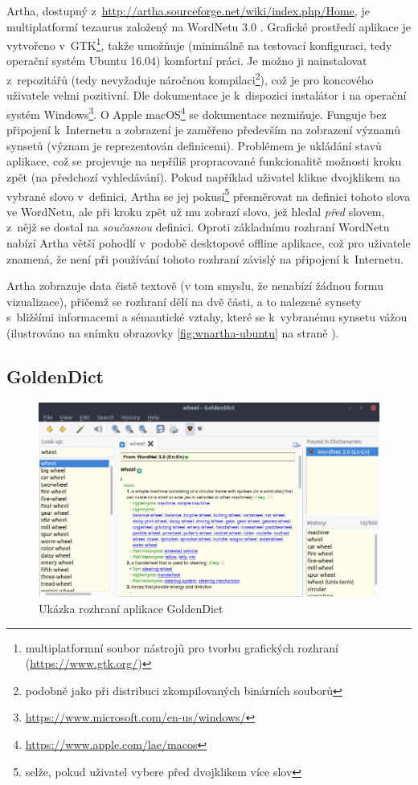 \documentclass[a4paper, 11pt, oneside, showtrims]{book}
\begin{document}
				Artha, dostupný z~\url{http://artha.sourceforge.net/wiki/index.php/Home}, je multiplatformí tezaurus založený na WordNetu 3.0 \parencite{ramaswamy2012}. Grafické prostředí aplikace je vytvořeno v~GTK\footnote{multiplatformní soubor nástrojů pro tvorbu grafických rozhraní (\url{https://www.gtk.org/})}, takže umožňuje (minimálně na testovací konfiguraci, tedy operační systém Ubuntu 16.04) komfortní práci. Je možno ji nainstalovat z~repozitářů (tedy nevyžaduje náročnou kompilaci\footnote{podobně jako při distribuci zkompilovaných binárních souborů}), což je pro koncového uživatele velmi pozitivní. Dle dokumentace je k~dispozici instalátor i na operační systém Windows\footnote{\url{https://www.microsoft.com/en-us/windows/}}. O Apple macOS\footnote{\url{https://www.apple.com/lae/macos}} se dokumentace nezmiňuje. Funguje bez připojení k~Internetu a zobrazení je zaměřeno především na zobrazení významů synsetů (význam je reprezentován definicemi). Problémem je ukládání stavů aplikace, což se projevuje na nepříliš propracované funkcionalitě možnosti kroku zpět (na předchozí vyhledávání). Pokud například uživatel klikne dvojklikem na vybrané slovo v~definici, Artha se jej pokusí\footnote{selže, pokud uživatel vybere před dvojklikem více slov} přesměrovat na definici tohoto slova ve WordNetu, ale při kroku zpět už mu zobrazí slovo, jež hledal \textit{před} slovem, z~nějž se dostal na \textit{současnou} definici. Oproti základnímu rozhraní WordNetu nabízí Artha větší pohodlí v~podobě desktopové offline aplikace, což pro uživatele znamená, že není při používání tohoto rozhraní závislý na připojení k~Internetu.

				Artha zobrazuje data čistě textově (v tom smyslu, že nenabízí žádnou formu vizualizace), přičemž se rozhraní dělí na dvě části, a to nalezené synsety s~bližšími informacemi a sémantické vztahy, které se k~vybranému synsetu vážou (ilustrováno na snímku obrazovky \ref{fig:wnartha-ubuntu} na straně \pageref{fig:wnartha-ubuntu}). 

			\subsection{GoldenDict}
 		
 				\begin{figure}[h]
					\centering
					\includegraphics[width=1.0\textwidth]{wngoldendick-ubuntu.png}
					\caption{Ukázka rozhraní aplikace GoldenDict}
					\label{fig:wngoldendick-ubuntu}
				\end{figure}
\end{document}
